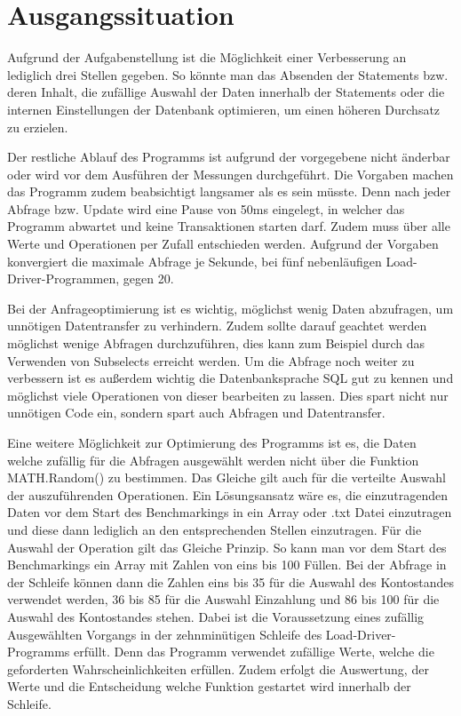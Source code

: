 \section{Ausgangssituation}

Aufgrund der Aufgabenstellung ist die Möglichkeit einer Verbesserung an
lediglich drei Stellen gegeben. So könnte man das Absenden der Statements bzw.
deren Inhalt, die zufällige Auswahl der Daten innerhalb der Statements oder die
internen Einstellungen der Datenbank optimieren, um einen höheren Durchsatz zu
erzielen.

Der restliche Ablauf des Programms ist aufgrund der vorgegebene 
nicht änderbar oder wird vor dem Ausführen der Messungen durchgeführt. Die Vorgaben machen das
Programm zudem beabsichtigt langsamer als es sein müsste. Denn nach jeder
Abfrage bzw. Update wird eine Pause von 50ms eingelegt, in welcher das Programm
abwartet und keine Transaktionen starten darf. Zudem muss über alle Werte und
Operationen per Zufall entschieden werden. Aufgrund der Vorgaben konvergiert
die maximale Abfrage je Sekunde, bei fünf nebenläufigen Load-Driver-Programmen,
gegen 20.

Bei der Anfrageoptimierung ist es wichtig, möglichst wenig Daten abzufragen, um
unnötigen Datentransfer zu verhindern. Zudem sollte darauf geachtet werden
möglichst wenige Abfragen durchzuführen, dies kann zum Beispiel durch das
Verwenden von Subselects erreicht werden. Um die Abfrage noch weiter zu
verbessern ist es außerdem wichtig die Datenbanksprache SQL gut zu kennen und
möglichst viele Operationen von dieser bearbeiten zu lassen. Dies spart nicht
nur unnötigen Code ein, sondern spart auch Abfragen und Datentransfer.

Eine weitere Möglichkeit zur Optimierung des Programms ist es, die Daten welche
zufällig für die Abfragen ausgewählt werden nicht über die Funktion
MATH.Random() zu bestimmen. Das Gleiche gilt auch für die verteilte Auswahl der
auszuführenden Operationen. Ein Lösungsansatz wäre es, die einzutragenden Daten
vor dem Start des Benchmarkings in ein Array oder .txt Datei einzutragen und
diese dann lediglich an den entsprechenden Stellen einzutragen. Für die Auswahl
der Operation gilt das Gleiche Prinzip. So kann man vor dem Start des
Benchmarkings ein Array mit Zahlen von eins bis 100 Füllen. Bei der Abfrage in
der Schleife können dann die Zahlen eins bis 35 für die Auswahl des
Kontostandes verwendet werden, 36 bis 85 für die Auswahl Einzahlung und 86 bis
100 für die Auswahl des Kontostandes stehen. Dabei ist die Voraussetzung eines
zufällig Ausgewählten Vorgangs in der zehnminütigen Schleife des
Load-Driver-Programms erfüllt. Denn das Programm verwendet zufällige Werte,
welche die geforderten Wahrscheinlichkeiten erfüllen. Zudem erfolgt die
Auswertung, der Werte und die Entscheidung welche Funktion gestartet wird
innerhalb der Schleife.

